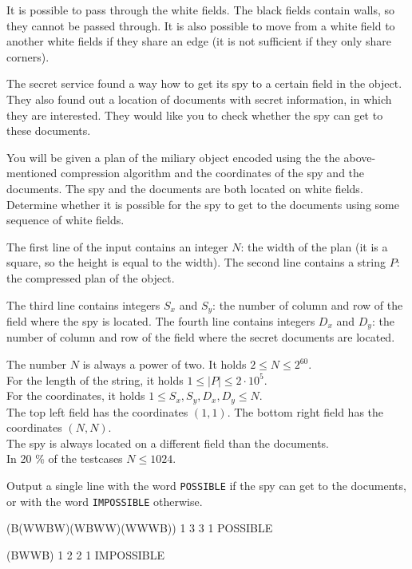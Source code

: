 It is possible to pass through the white fields. The black fields contain walls,
so they cannot be passed through. It is also possible to move from a white field
to another white fields if they share an edge (it is not sufficient if they only
share corners).

The secret service found a way how to get its spy to a certain field in the
object. They also found out a location of documents with secret information, in
which they are interested. They would like you to check whether the spy can get
to these documents.


You will be given a plan of the miliary object encoded using the the
above-mentioned compression algorithm and the coordinates of the spy and the
documents. The spy and the documents are both located on white fields. Determine
whether it is possible for the spy to get to the documents using some sequence
of white fields.


The first line of the input contains an integer $N$: the width of the plan (it
is a square, so the height is equal to the width). The second line contains a
string $P$: the compressed plan of the object.

The third line contains integers $S_x$ and $S_y$: the number of column and row
of the field where the spy is located. The fourth line contains integers $D_x$
and $D_y$: the number of column and row of the field where the secret documents
are located.

\bigskip
\noindent
The number $N$ is always a power of two. It holds $2 \leq N \leq 2^{60}$.\\
For the length of the string, it holds $1 \leq \vert P \vert \leq 2 \cdot 10^5$.\\
For the coordinates, it holds $1 \leq S_x, S_y, D_x, D_y \leq N$.\\
The top left field has the coordinates $(1, 1)$. The bottom right field has the
  coordinates $(N, N)$.\\
The spy is always located on a different field than the documents.\\
In 20 \% of the testcases $N \leq 1024$.


Output a single line with the word \texttt{POSSIBLE} if the spy can get to the
documents, or with the word \texttt{IMPOSSIBLE} otherwise.


(B(WWBW)(WBWW)(WWWB))
1 3
3 1
\sampleOUT
POSSIBLE
\sampleEND

(BWWB)
1 2
2 1
\sampleOUT
IMPOSSIBLE
\sampleEND


